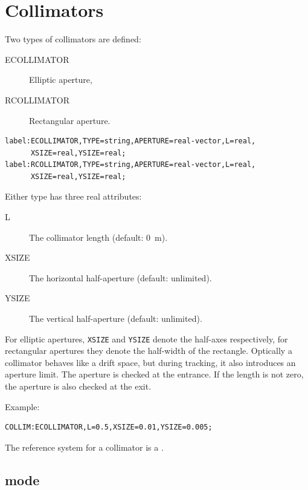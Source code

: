 

\section{Collimators}
\label{sec:collimators}
Two types of collimators are defined:
\begin{description}
\item[ECOLLIMATOR]
  \label{sec:ecollimator}
  Elliptic aperture,
\item[RCOLLIMATOR]
  \label{sec:rcollimator}
  Rectangular aperture.
\end{description}
\begin{verbatim}
label:ECOLLIMATOR,TYPE=string,APERTURE=real-vector,L=real,
      XSIZE=real,YSIZE=real;
label:RCOLLIMATOR,TYPE=string,APERTURE=real-vector,L=real,
      XSIZE=real,YSIZE=real;
\end{verbatim}
Either type has three real attributes:
\begin{description}
\item[L]
  The collimator length (default: 0~m).
\item[XSIZE]
  The horizontal half-aperture (default: unlimited).
\item[YSIZE]
  The vertical half-aperture (default: unlimited).
\end{description}
For elliptic apertures,
\texttt{XSIZE} and \texttt{YSIZE} denote the half-axes respectively,
for rectangular apertures they denote the half-width of the rectangle.
Optically a collimator behaves like a drift space, but during tracking,
it also introduces an aperture limit.
The aperture is checked at the entrance.
If the length is not zero, the aperture is also checked at the exit.

\noindent Example:
\begin{verbatim}
COLLIM:ECOLLIMATOR,L=0.5,XSIZE=0.01,YSIZE=0.005;
\end{verbatim}
The reference system for a collimator is a 
.

\subsection{\opalt mode}

